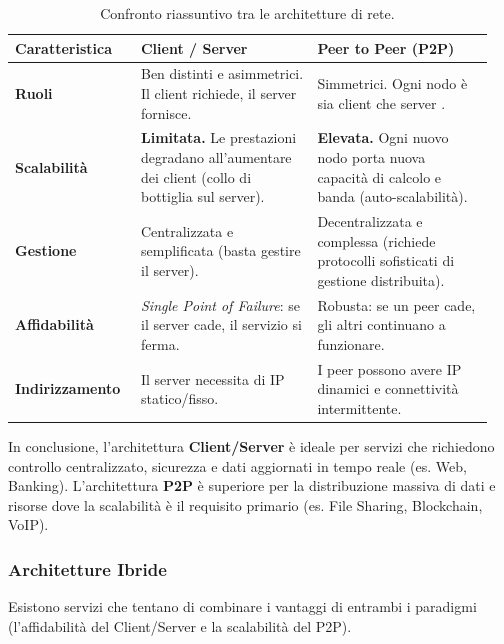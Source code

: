 \documentclass[a4paper,12pt]{report}
\renewcommand{\arraystretch}{1.2} %
\begin{document}
\begin{table}[H]
    \centering
    \renewcommand{\arraystretch}{1.5} %
    \begin{tabular}{|p{0.25\linewidth}|p{0.35\linewidth}|p{0.35\linewidth}|}
        \hline
        \textbf{Caratteristica} & \textbf{Client / Server} & \textbf{Peer to Peer (P2P)} \\
        \hline
        \textbf{Ruoli} & Ben distinti e asimmetrici. Il client richiede, il server fornisce. & Simmetrici. Ogni nodo è sia client che server . \\
        \hline
        \textbf{Scalabilità} & \textbf{Limitata.} Le prestazioni degradano all'aumentare dei client (collo di bottiglia sul server). & \textbf{Elevata.} Ogni nuovo nodo porta nuova capacità di calcolo e banda (auto-scalabilità). \\
        \hline
        \textbf{Gestione} & Centralizzata e semplificata (basta gestire il server). & Decentralizzata e complessa (richiede protocolli sofisticati di gestione distribuita). \\
        \hline
        \textbf{Affidabilità} & \textit{Single Point of Failure}: se il server cade, il servizio si ferma. & Robusta: se un peer cade, gli altri continuano a funzionare. \\
        \hline
        \textbf{Indirizzamento} & Il server necessita di IP statico/fisso. & I peer possono avere IP dinamici e connettività intermittente. \\
        \hline
    \end{tabular}
    \caption{Confronto riassuntivo tra le architetture di rete.}
    \label{tab:confronto_cs_p2p}
\end{table}

In conclusione, l'architettura \textbf{Client/Server} è ideale per servizi che richiedono controllo centralizzato, sicurezza e dati aggiornati in tempo reale (es. Web, Banking). L'architettura \textbf{P2P} è superiore per la distribuzione massiva di dati e risorse dove la scalabilità è il requisito primario (es. File Sharing, Blockchain, VoIP).

\newpage
\subsubsection{Architetture Ibride}

Esistono servizi che tentano di combinare i vantaggi di entrambi i paradigmi (l'affidabilità del Client/Server e la scalabilità del P2P).
\end{document}
